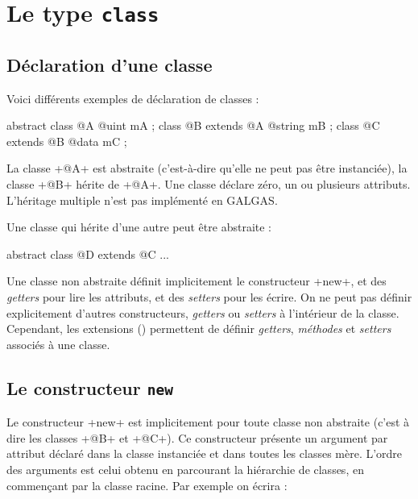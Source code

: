 
\chapter{Le type \texttt{class}}

\section{Déclaration d'une classe}

Voici différents exemples de déclaration de classes :

\begin{galgas}
abstract class @A {
  @uint mA ;
}
class @B extends @A {
  @string mB ;
}
class @C extends @B {
  @data mC ;
}
\end{galgas}

La classe \ggs+@A+ est abstraite (c'est-à-dire qu'elle ne peut pas être instanciée), la classe \ggs+@B+ hérite de \ggs+@A+. Une classe déclare zéro, un ou plusieurs attributs. L'héritage multiple n'est pas implémenté en GALGAS.

Une classe qui hérite d'une autre peut être abstraite :
\begin{galgas}
abstract class @D extends @C {
  ...
 }
\end{galgas}

Une classe non abstraite définit implicitement le constructeur \ggs+new+, et des \emph{getters} pour lire les attributs, et des \emph{setters} pour les écrire. On ne peut pas définir explicitement d'autres constructeurs, \emph{getters} ou \emph{setters} à l'intérieur de la classe. Cependant,  les extensions () permettent de définir \emph{getters}, \emph{méthodes} et \emph{setters} associés à une classe.












\section{Le constructeur \texttt{new}}

Le constructeur \ggs+new+ est implicitement pour toute classe non abstraite (c'est à dire les classes \ggs+@B+ et \ggs+@C+). Ce constructeur présente un argument par attribut déclaré dans la classe instanciée et dans toutes les classes mère. L'ordre des arguments est celui obtenu en parcourant la hiérarchie de classes, en commençant par la classe racine. Par exemple on écrira :

